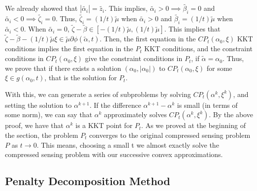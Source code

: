 \documentclass[letterpaper, 10 pt, conference]{article}
\begin{document}
\noindent We already showed that $|\tilde{\alpha_i}| = \tilde{z_i}$. This implies, $\tilde{\alpha_i} > 0 \implies \tilde{\beta_i} = 0$ and $\tilde{\alpha_i} < 0 \implies \tilde{\zeta_i} = 0$. Thus, $\tilde{\zeta_i} = (1/t)\tilde{\mu}$ when $\tilde{\alpha_i} > 0$ and $\tilde{\beta_i} = (1/t)\tilde{\mu}$ when $\tilde{\alpha_i} < 0$. When $\tilde{\alpha_i} = 0$, $\tilde{\zeta} - \tilde{\beta} \in \left[-(1/t)\tilde{\mu}, (1/t)\tilde{\mu}\right]$. This implies that $\tilde{\zeta} - \tilde{\beta} - (1/t) \tilde{\mu} \xi \in \tilde{\mu} \partial\phi(\tilde{\alpha}, t)$. Then, the first equation in the $CP_t(\alpha_0, \xi)$ KKT conditions implies the first equation in the $P_t$ KKT conditions, and the constraint conditions in $CP_t(\alpha_0, \xi)$ give the constraint conditions in $P_t$, if $\tilde{\alpha} = \alpha_0$. Thus, we prove that if there exists a solution $(\alpha_0, |\alpha_0|)$ to $CP_t(\alpha_0, \xi)$ for some $\xi \in g(\alpha_0, t)$, that is the solution for $P_t$.

With this, we can generate a series of subproblems by solving $CP_t(\alpha^k, \xi^k)$, and setting the solution to $\alpha^{k+1}$. If the difference $\alpha^{k+1} - \alpha^{k}$ is small (in terms of some norm), we can say that $\alpha^{k}$ approximately solves $CP_t(\alpha^k, \xi^k)$. By the above proof, we have that $\alpha^k$ is a KKT point for $P_t$. As we proved at the beginning of the section, the problem $P_t$ converges to the original compressed sensing problem $P$ as $t \rightarrow 0$. This means, choosing a small t we almost exactly solve the compressed sensing problem with our successive convex approximations.

\subsection{Penalty Decomposition Method}
\end{document}

